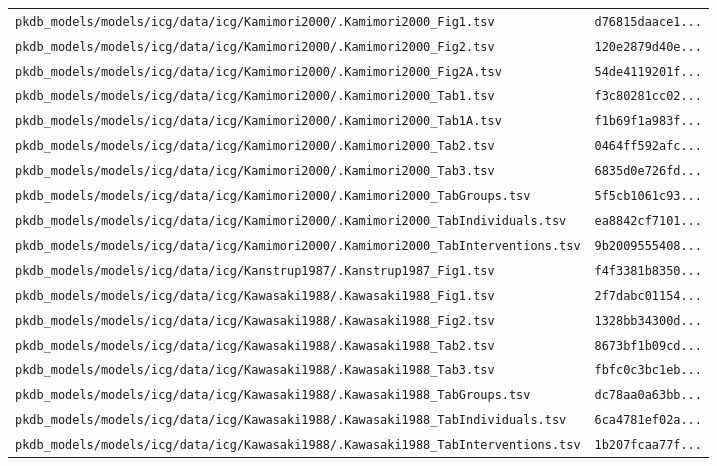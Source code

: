 \begin{longtable}{ll}
\texttt{pkdb\_models/models/icg/data/icg/Kamimori2000/.Kamimori2000\_Fig1.tsv} & \texttt{d76815daace1...} \\
\texttt{pkdb\_models/models/icg/data/icg/Kamimori2000/.Kamimori2000\_Fig2.tsv} & \texttt{120e2879d40e...} \\
\texttt{pkdb\_models/models/icg/data/icg/Kamimori2000/.Kamimori2000\_Fig2A.tsv} & \texttt{54de4119201f...} \\
\texttt{pkdb\_models/models/icg/data/icg/Kamimori2000/.Kamimori2000\_Tab1.tsv} & \texttt{f3c80281cc02...} \\
\texttt{pkdb\_models/models/icg/data/icg/Kamimori2000/.Kamimori2000\_Tab1A.tsv} & \texttt{f1b69f1a983f...} \\
\texttt{pkdb\_models/models/icg/data/icg/Kamimori2000/.Kamimori2000\_Tab2.tsv} & \texttt{0464ff592afc...} \\
\texttt{pkdb\_models/models/icg/data/icg/Kamimori2000/.Kamimori2000\_Tab3.tsv} & \texttt{6835d0e726fd...} \\
\texttt{pkdb\_models/models/icg/data/icg/Kamimori2000/.Kamimori2000\_TabGroups.tsv} & \texttt{5f5cb1061c93...} \\
\texttt{pkdb\_models/models/icg/data/icg/Kamimori2000/.Kamimori2000\_TabIndividuals.tsv} & \texttt{ea8842cf7101...} \\
\texttt{pkdb\_models/models/icg/data/icg/Kamimori2000/.Kamimori2000\_TabInterventions.tsv} & \texttt{9b2009555408...} \\
\texttt{pkdb\_models/models/icg/data/icg/Kanstrup1987/.Kanstrup1987\_Fig1.tsv} & \texttt{f4f3381b8350...} \\
\texttt{pkdb\_models/models/icg/data/icg/Kawasaki1988/.Kawasaki1988\_Fig1.tsv} & \texttt{2f7dabc01154...} \\
\texttt{pkdb\_models/models/icg/data/icg/Kawasaki1988/.Kawasaki1988\_Fig2.tsv} & \texttt{1328bb34300d...} \\
\texttt{pkdb\_models/models/icg/data/icg/Kawasaki1988/.Kawasaki1988\_Tab2.tsv} & \texttt{8673bf1b09cd...} \\
\texttt{pkdb\_models/models/icg/data/icg/Kawasaki1988/.Kawasaki1988\_Tab3.tsv} & \texttt{fbfc0c3bc1eb...} \\
\texttt{pkdb\_models/models/icg/data/icg/Kawasaki1988/.Kawasaki1988\_TabGroups.tsv} & \texttt{dc78aa0a63bb...} \\
\texttt{pkdb\_models/models/icg/data/icg/Kawasaki1988/.Kawasaki1988\_TabIndividuals.tsv} & \texttt{6ca4781ef02a...} \\
\texttt{pkdb\_models/models/icg/data/icg/Kawasaki1988/.Kawasaki1988\_TabInterventions.tsv} & \texttt{1b207fcaa77f...} \\

\end{longtable}
